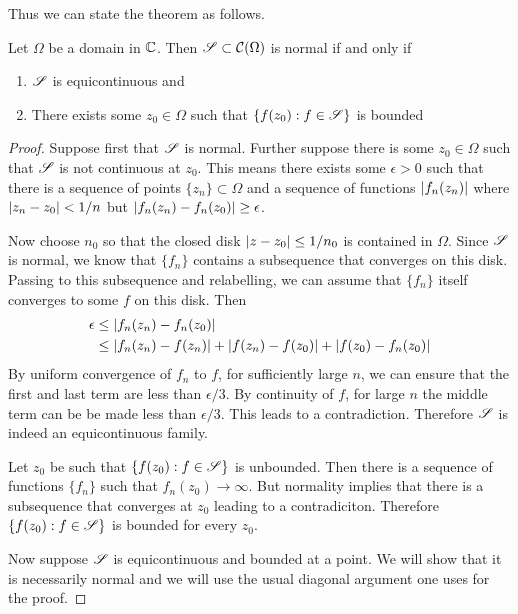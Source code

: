 Thus we can state the theorem as follows.
\begin{theorem}\label{thm:arzela-ascoli}
    Let $\Omega$ be a domain in $\mathbb{C}$. Then $\mathscr{S} \subset \mathcal{C}(\Omega)$ is normal if and only if 
    \begin{enumerate}
        \item $\mathscr{S}$ is equicontinuous and
        \item There exists some $z_0 \in \Omega$ such that $\{f(z_0): f \in \mathscr{S}\}$ is bounded
    \end{enumerate}
\end{theorem}
\begin{proof}
    Suppose first that $\mathscr{S}$ is normal. Further suppose there is some $z_0 \in \Omega$ such that $\mathscr{S}$ is not continuous at $z_0$. This means there exists some $\epsilon > 0$ such that there is a sequence of points $\{z_n\} \subset \Omega$ and a sequence of functions $\left|f_n(z_n)\right|$ where $\left|z_n - z_0\right| < 1/n$ but $\left|f_n(z_n) - f_n(z_0)\right| \geq \epsilon$. 

    Now choose $n_0$ so that the closed disk $\left|z - z_0\right| \leq 1/n_0$ is contained in $\Omega$. Since $\mathscr{S}$ is normal, we know that $\{f_n\}$ contains a subsequence that converges on this disk. Passing to this subsequence and relabelling, we can assume that $\{f_n\}$ itself converges to some $f$ on this disk. Then 
    \begin{align*}
        \epsilon &\leq \left|f_n(z_n) - f_n(z_0)\right|\\ 
        &\leq \left|f_n(z_n) - f(z_n)\right| + \left|f(z_n) - f(z_0)\right| + \left|f(z_0) - f_n(z_0)\right| 
    \end{align*} 
    By uniform convergence of $f_n$ to $f$, for sufficiently large $n$, we can ensure that the first and last term are less than $\epsilon/3$. By continuity of $f$, for large $n$ the middle term can be be made less than $\epsilon/3$. This leads to a contradiction. Therefore $\mathscr{S}$ is indeed an equicontinuous family. 

    Let $z_0$ be such that $\{f(z_0): f \in \mathscr{S}\}$ is unbounded. Then there is a sequence of functions $\{f_n\}$ such that $f_n(z_0) \to \infty$. But normality implies that there is a subsequence that converges at $z_0$ leading to a contradiciton. Therefore $\{f(z_0): f \in \mathscr{S}\}$ is bounded for every $z_0$. 

    Now suppose $\mathscr{S}$ is equicontinuous and bounded at a point. We will show that it is necessarily normal and we will use the usual diagonal argument one uses for the proof.


\end{proof}
